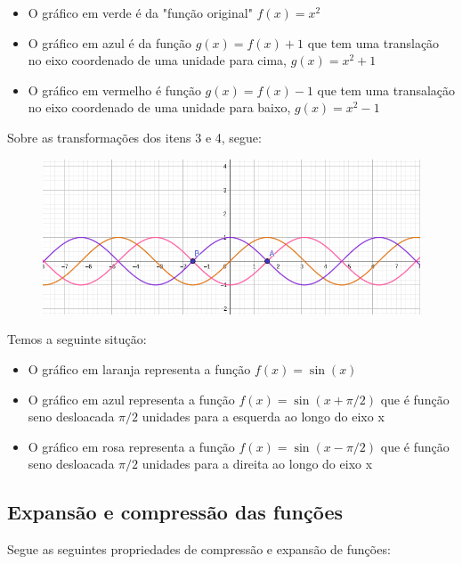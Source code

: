 \begin{multicols*}{2}
\begin{itemize}
                \item O gráfico em verde é da "função original" $f(x) = x^2$
                \item O gráfico em azul é da função $g(x) = f(x) + 1$ que tem uma translação no eixo 							coordenado de uma unidade para cima, $g(x) = x^2 + 1 $
                \item O gráfico em vermelho é função $g(x) = f(x) - 1$ que tem uma transalação no eixo 							coordenado de uma unidade para baixo, $g(x) = x^2 -1$
            \end{itemize}
            Sobre as transformações dos itens 3 e 4, segue:
            \begin{figure}[H]
                    \includegraphics[scale=0.25]{assets/rafael/img8.png}
            \end{figure}
            Temos a seguinte situção:
            \begin{itemize}
                \item O gráfico em laranja representa a função $f(x) = \sin(x)$
                \item O gráfico em azul representa a função $f(x) = \sin(x + \pi/2)$ que é função seno 							desloacada $\pi/2$ unidades para a esquerda ao longo do eixo x
                \item O gráfico em rosa representa a função $f(x) = \sin(x - \pi/2)$ que é função seno 							desloacada $\pi/2$ unidades para a direita ao longo do eixo x
            \end{itemize}
            \subsection*{Expansão e compressão das funções}
            Segue as seguintes propriedades de compressão e expansão de funções:
            

\end{multicols*}
